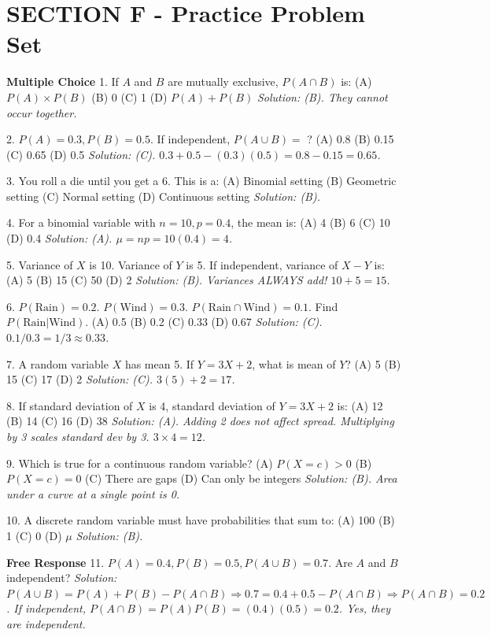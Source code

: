 \section{SECTION F - Practice Problem Set}
\begin{workbookbox}
\textbf{Multiple Choice}
1. If $A$ and $B$ are mutually exclusive, $P(A \cap B)$ is:
(A) $P(A) \times P(B)$ (B) 0 (C) 1 (D) $P(A) + P(B)$
\textit{Solution: (B). They cannot occur together.}

2. $P(A)=0.3, P(B)=0.5$. If independent, $P(A \cup B) =$ ?
(A) 0.8 (B) 0.15 (C) 0.65 (D) 0.5
\textit{Solution: (C). $0.3 + 0.5 - (0.3)(0.5) = 0.8 - 0.15 = 0.65$.}

3. You roll a die until you get a 6. This is a:
(A) Binomial setting (B) Geometric setting (C) Normal setting (D) Continuous setting
\textit{Solution: (B).}

4. For a binomial variable with $n=10, p=0.4$, the mean is:
(A) 4 (B) 6 (C) 10 (D) 0.4
\textit{Solution: (A). $\mu = np = 10(0.4) = 4$.}

5. Variance of $X$ is 10. Variance of $Y$ is 5. If independent, variance of $X-Y$ is:
(A) 5 (B) 15 (C) 50 (D) 2
\textit{Solution: (B). Variances ALWAYS add! $10+5=15$.}

6. $P(\text{Rain})=0.2$. $P(\text{Wind})=0.3$. $P(\text{Rain} \cap \text{Wind})=0.1$. Find $P(\text{Rain} | \text{Wind})$.
(A) 0.5 (B) 0.2 (C) 0.33 (D) 0.67
\textit{Solution: (C). $0.1 / 0.3 = 1/3 \approx 0.33$.}

7. A random variable $X$ has mean 5. If $Y = 3X + 2$, what is mean of $Y$?
(A) 5 (B) 15 (C) 17 (D) 2
\textit{Solution: (C). $3(5)+2 = 17$.}

8. If standard deviation of $X$ is 4, standard deviation of $Y = 3X + 2$ is:
(A) 12 (B) 14 (C) 16 (D) 38
\textit{Solution: (A). Adding 2 does not affect spread. Multiplying by 3 scales standard dev by 3. $3 \times 4 = 12$.}

9. Which is true for a continuous random variable?
(A) $P(X = c) > 0$ (B) $P(X = c) = 0$ (C) There are gaps (D) Can only be integers
\textit{Solution: (B). Area under a curve at a single point is 0.}

10. A discrete random variable must have probabilities that sum to:
(A) 100 (B) 1 (C) 0 (D) $\mu$
\textit{Solution: (B).}

\textbf{Free Response}
11. $P(A) = 0.4, P(B) = 0.5, P(A \cup B) = 0.7$. Are $A$ and $B$ independent?
\textit{Solution: $P(A \cup B) = P(A) + P(B) - P(A \cap B) \Rightarrow 0.7 = 0.4 + 0.5 - P(A \cap B) \Rightarrow P(A \cap B) = 0.2$. If independent, $P(A \cap B) = P(A)P(B) = (0.4)(0.5) = 0.2$. Yes, they are independent.}


\end{workbookbox}
